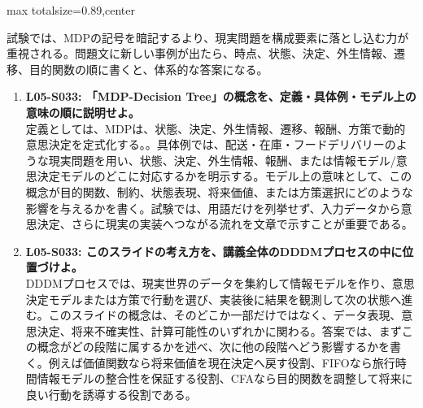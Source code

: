 \begin{minipage}[t]{0.58\textwidth}
\begin{adjustbox}{max totalsize={\textwidth}{0.89\textheight},center}
\begin{minipage}{\textwidth}
試験では、MDPの記号を暗記するより、現実問題を構成要素に落とし込む力が重視される。問題文に新しい事例が出たら、時点、状態、決定、外生情報、遷移、目的関数の順に書くと、体系的な答案になる。\par{}\begin{enumerate}\item \textbf{L05-S033: 「MDP-Decision Tree」の概念を、定義・具体例・モデル上の意味の順に説明せよ。}\\定義としては、MDPは、状態、決定、外生情報、遷移、報酬、方策で動的意思決定を定式化する。。具体例では、配送・在庫・フードデリバリーのような現実問題を用い、状態、決定、外生情報、報酬、または情報モデル/意思決定モデルのどこに対応するかを明示する。モデル上の意味として、この概念が目的関数、制約、状態表現、将来価値、または方策選択にどのような影響を与えるかを書く。試験では、用語だけを列挙せず、入力データから意思決定、さらに現実の実装へつながる流れを文章で示すことが重要である。\item \textbf{L05-S033: このスライドの考え方を、講義全体のDDDMプロセスの中に位置づけよ。}\\DDDMプロセスでは、現実世界のデータを集約して情報モデルを作り、意思決定モデルまたは方策で行動を選び、実装後に結果を観測して次の状態へ進む。このスライドの概念は、そのどこか一部だけではなく、データ表現、意思決定、将来不確実性、計算可能性のいずれかに関わる。答案では、まずこの概念がどの段階に属するかを述べ、次に他の段階へどう影響するかを書く。例えば価値関数なら将来価値を現在決定へ戻す役割、FIFOなら旅行時間情報モデルの整合性を保証する役割、CFAなら目的関数を調整して将来に良い行動を誘導する役割である。\end{enumerate}
\end{minipage}
\end{adjustbox}
\end{minipage}


